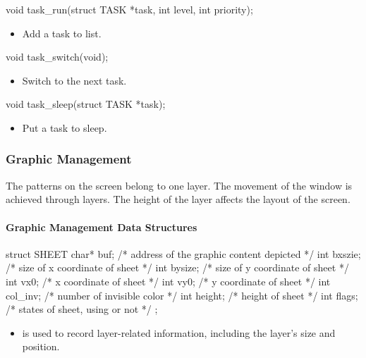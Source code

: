 \documentclass{swfcthesis}
\begin{document}
\begin{ccode}
void task_run(struct TASK *task, int level, int priority);
\end{ccode}
\begin{itemize}
\item Add a task to list.
\end{itemize}

\begin{ccode}
void task_switch(void);
\end{ccode}
\begin{itemize}
\item Switch to the next task.
\end{itemize}

\begin{ccode}
void task_sleep(struct TASK *task);
\end{ccode}
\begin{itemize}
\item Put a task to sleep.
\end{itemize}

\subsubsection{Graphic Management}
\label{sec:graphic}

The patterns on the screen belong to one layer. The movement of the window is achieved
through layers. The height of the layer affects the layout of the
screen. 
  
\paragraph{Graphic Management Data Structures}

\begin{codeblock}[1]
\begin{ccode}
struct SHEET
{ 
  char* buf;   /* address of the graphic content depicted */
  int bxszie;  /* size of x coordinate of sheet */
  int bysize;  /* size of y coordinate of sheet */
  int vx0;     /* x coordinate of sheet */
  int vy0;     /* y coordinate of sheet */
  int col_inv; /* number of invisible color */
  int height;  /* height of sheet */
  int flags;   /* states of sheet, using or not */
};
\end{ccode}
\end{codeblock}
\begin{itemize}
\item is used to record layer-related information, including the layer's size and
  position.
\end{itemize}
\end{document}
